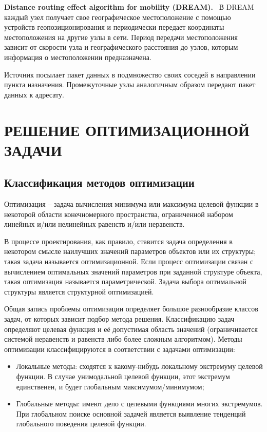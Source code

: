 \documentclass[14pt,a4paper,titlepage]{extarticle}
\renewcommand{\paragraph}[1]{\textbf{#1.}~}
\begin{document}
\paragraph{Distance routing effect algorithm for mobility (DREAM)}
В DREAM каждый узел получает свое географическое местоположение с помощью устройств геопозиционирования и периодически передает координаты местоположения на другие узлы в сети. Период передачи местоположения зависит от скорости узла и географического расстояния до узлов, которым информация о местоположении предназначена. 

Источник посылает пакет данных в подмножество своих соседей в направлении пункта назначения. Промежуточные узлы аналогичным образом передают пакет данных к адресату.

\section{РЕШЕНИЕ ОПТИМИЗАЦИОННОЙ ЗАДАЧИ}
\subsection{Классификация методов оптимизации}
Оптимизация -- задача вычисления минимума или максимума целевой функции в некоторой области конечномерного пространства, ограниченной набором линейных и/или нелинейных равенств и/или неравенств.

В процессе проектирования, как правило, ставится задача определения в некотором смысле наилучших значений параметров объектов или их структуры; такая задача называется оптимизационной. Если процесс оптимизации связан с вычислением оптимальных значений параметров при заданной структуре объекта, такая оптимизация называется параметрической. Задача выбора оптимальной структуры является структурной оптимизацией.

Общая запись проблемы оптимизации определяет большое разнообразие классов задач, от которых зависит подбор метода решения. Классификацию задач определяют целевая функция и её допустимая область значений (ограничивается системой неравенств и равенств либо более сложным алгоритмом). Методы оптимизации классифицируются в соответствии с задачами оптимизации: 
\begin{itemize}
\item Локальные методы: сходятся к какому-нибудь локальному экстремуму целевой функции. В случае унимодальной целевой функции, этот экстремум единственен, и будет глобальным максимумом/минимумом;
\item Глобальные методы: имеют дело с целевыми функциями многих экстремумов. При глобальном поиске основной задачей является выявление тенденций глобального поведения целевой функции. 
\end{itemize}
\end{document}
